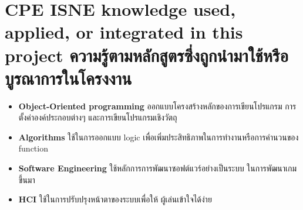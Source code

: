 





\newpage
\section{\ifenglish%
    \ifcpe CPE \else ISNE \fi knowledge used, applied, or integrated in this project
  \else%
    ความรู้ตามหลักสูตรซึ่งถูกนำมาใช้หรือบูรณาการในโครงงาน
  \fi
 }

\begin{itemize}
  \item \textbf{Object-Oriented programming} ออกแบบโครงสร้างหลักของการเขียนโปรแกรม การตั้งค่าองค์ประกอบต่างๆ และการเขียนโปรแกรมเชิงวัตถุ
  \item \textbf{Algorithms} ใช้ในการออกแบบ logic เพื่อเพิ่มประสิทธิภาพในการทำงานหรือการคำนวนของ function
  \item \textbf{Software Engineering} ใช้หลักการการพัฒนาซอฟต์แวร์อย่างเป็นระบบ ในการพัฒนาเกมขึ้นมา
  \item \textbf{HCI} ใช้ในการปรับปรุงหน้าตาของระบบเพื่อให้ ผู้เล่นเข้าใจได้ง่าย
\end{itemize}

